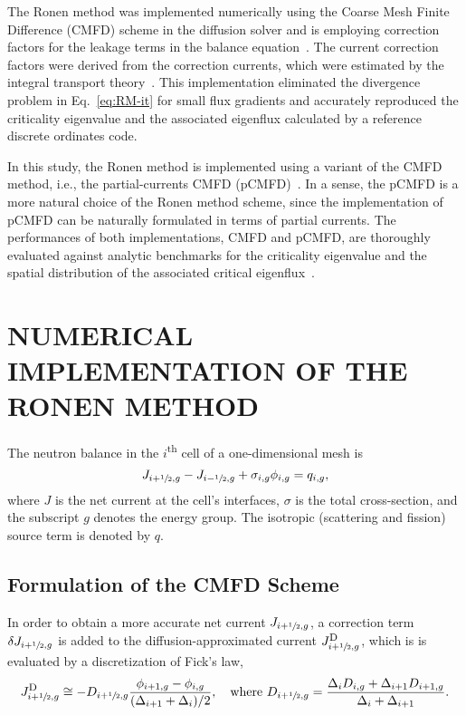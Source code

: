 \documentclass[letterpaper]{mc2021}
\newcommand{\tsup}[1]{\textsuperscript{#1}}
\newcommand{\hzi}{\ensuremath{\sfrac{1}{2}}}
\newcommand{\jD}{\ensuremath{J^{\textrm{\scriptsize{D}}}}}
\begin{document}
\vspace{-10.5mm}

The Ronen method was implemented numerically using the Coarse Mesh Finite Difference (CMFD) scheme in the diffusion solver and is employing correction factors for the leakage terms in the balance equation~\cite{Tomatis-2011}. The current correction factors were derived from the correction currents, which were estimated by the integral transport theory~\cite{Gross-2020}. This implementation eliminated the divergence problem in Eq.~\eqref{eq:RM-it} for small flux gradients and accurately reproduced the criticality eigenvalue and the associated eigenflux calculated by a reference discrete ordinates code. 

\vspace{-1.5mm}

In this study, the Ronen method is implemented using a variant of the CMFD method, i.e., the partial-currents CMFD (pCMFD)~\cite{Cho-2003}. In a sense, the pCMFD is a more natural choice of the Ronen method scheme, since the implementation of pCMFD can be naturally formulated in terms of partial currents. The performances of both implementations, CMFD and pCMFD, are thoroughly evaluated against analytic benchmarks for the criticality eigenvalue and the spatial distribution of the associated critical eigenflux~\cite{Sood2003}.    

\section{NUMERICAL IMPLEMENTATION OF THE RONEN METHOD} 
\label{sec:num-imp}

The neutron balance in the $i$\tsup{th} cell of a one-dimensional mesh is
\begin{equation}
\label{eq:balance}
J_{i+\hzi,g} - J_{i-\hzi,g} + \sigma_{i,g} \phi_{i,g} = q_{i,g},
\end{equation}
where $J$ is the net current at the cell's interfaces, $\sigma$ is the total cross-section, and the subscript $g$ denotes the energy group. The isotropic (scattering and fission) source term is denoted by $q$.

\vspace{-1.5mm}

\subsection{Formulation of the CMFD Scheme} 
\label{sec:cmfd}

In order to obtain a more accurate net current $J_{i+\hzi,g}$, a correction term $\delta J_{i+\hzi,g}$ is added to the diffusion-approximated current $\jD_{i+\hzi,g}$, which is is evaluated by a discretization of Fick's law, 
\begin{equation}
\label{eq:JD}
\jD_{i+\hzi,g} \cong - D_{i+\hzi,g}
\frac{\phi_{i+1,g} - \phi_{i,g}}{(\Delta_{i+1} + \Delta_i)/2},
\quad \text{where }
D_{i+\hzi,g} = \frac{\Delta_i D_{i,g} + \Delta_{i+1} D_{i+1,g}}
{\Delta_i + \Delta_{i+1}}.
\end{equation}
\end{document}
